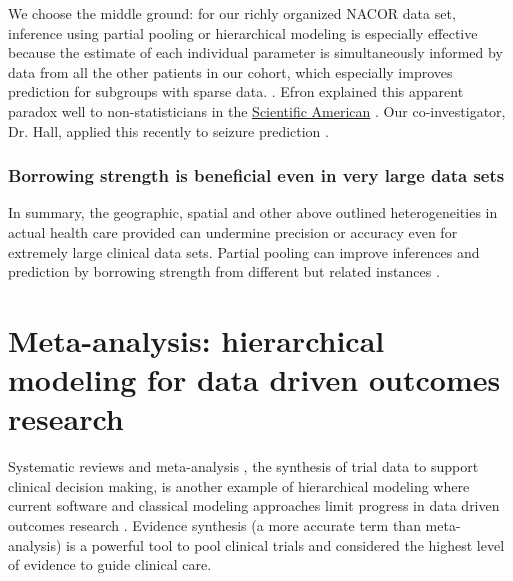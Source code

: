 \documentclass[11pt,notitlepage]{article}
\begin{document}
We choose the middle ground: for our richly organized NACOR data set, inference 
using partial pooling or hierarchical modeling is especially effective because 
the estimate of each individual parameter is simultaneously informed by data from 
all the other patients in our cohort, which especially improves prediction for 
subgroups with sparse data. \cite{Gelman2009}. Efron explained this apparent 
paradox well to non-statisticians in the 
\href{http://www.nature.com/scientificamerican/journal/v236/n5/pdf/
scientificamerican0577-119.pdf}{Scientific American}
\cite{Stein_paradox_Scientific_American}. 
Our co-investigator, Dr. Hall, applied this recently to seizure prediction \cite{Hall2009a}. 

\subsubsection*{Borrowing strength is beneficial even in very large data sets}
In summary, the geographic, spatial and other above outlined heterogeneities 
in actual health care provided can undermine precision or accuracy even for 
extremely large clinical data sets. Partial pooling can improve inferences and prediction
by borrowing strength from different but related instances
\cite{Tukey1963borrowing,Jones1986collected}. 

\section*{Meta-analysis: hierarchical modeling for data driven outcomes research}
Systematic reviews and meta-analysis \cite{Sackett1996}, the synthesis of trial data 
to support clinical decision making, is another example of hierarchical modeling where current software and 
classical modeling approaches limit progress in data driven outcomes research \cite{Andreae2015}.  
Evidence synthesis (a more accurate term than meta-analysis) is a powerful tool 
to pool clinical trials and considered the highest level of evidence to guide clinical care\cite{Ashby2000,Cook1997}. 
\end{document}
